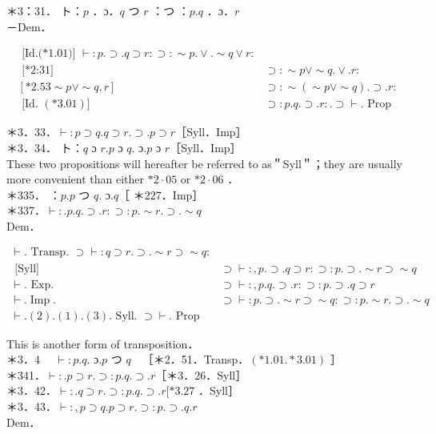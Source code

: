 \documentclass[10pt]{article}
\begin{document}
＊3：31． ト：$p$ ．ɔ．$q$ つ $r$ ：つ ：$p . q$ ．ɔ．$r$\\
－Dem．

$$
\begin{array}{ll}
\text { [Id.(*1.01)] } \vdash: p . \supset . q \supset r: \supset: \sim p . \vee . \sim q \vee r: \\
\text { [*2:31] } & \supset: \sim p \vee \sim q . \vee . r: \\
{[* 2.53 \sim p \vee \sim q, r]} & \supset: \sim(\sim p \vee \sim q) . \supset . r: \\
\text { [Id. }(* 3.01)] & \supset: p . q . \supset . r: . \supset \vdash . \text { Prop }
\end{array}
$$

＊3．33．$\vdash: p \supset q . q \supset r . \supset . p \supset r$［Syll．Imp］\\
＊3．34． ト：$q$ ɔ $r . p$ ɔ $q$. ɔ.$p$ ɔ $r$［Syll．Imp］\\
These two propositions will hereafter be referred to as＂Syll＂；they are usually more convenient than either $* 2 \cdot 05$ or $* 2 \cdot 06$ ．\\
＊335． ：$p . p$ つ $q$. ɔ.$q$［ ＊227．Imp］\\
＊337．$\vdash: . p . q . \supset . r: \supset: p . \sim r . \supset . \sim q$\\
Dem．

\[
\begin{array}{ll}
\vdash . \text { Transp. } \supset \vdash: q \supset r . \supset . \sim r \supset \sim q: \\
\text { [Syll] } & \supset \vdash:, p . \supset . q \supset r: \supset: p . \supset . \sim r \supset \sim q \\
\vdash . \text { Exp. } & \supset \vdash:, p . q . \supset . r: \supset: p . \supset . q \supset r \\
\vdash . \operatorname{Imp} . & \supset \vdash: p . \supset . \sim r \supset \sim q: \supset: p . \sim r . \supset . \sim q  \tag{3}\\
\vdash .(2) .(1) .(3) . \text { Syll. } \supset \vdash . \text { Prop }
\end{array}
\]

This is another form of transposition．\\
＊3．4 $\quad \vdash: p . q$. ɔ.$p$ つ $q \quad$［＊2．51．Transp．$(* 1.01 . * 3.01)$ ］\\
＊341．$\vdash: . p \supset r . \supset: p . q . \supset . r$［＊3．26．Syll］\\
＊3．42．$\vdash: . q \supset r . \supset: p . q . \supset . r[* 3.27$ ．Syll］\\
＊3．43．$\vdash:, p \supset q . p \supset r . \supset: p . \supset . q . r$\\
Dem．
\end{document}

